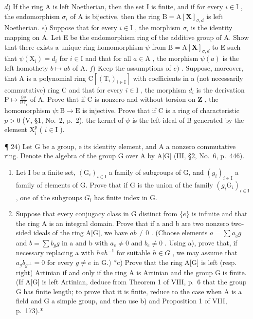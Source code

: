 \(d)\) If the ring A is left Noetherian, then the set I is finite, and if for every \(i \in \mathrm{I}\) , the endomorphism \(\sigma_i\) of A is bijective, then the ring \(\mathrm{B} = \mathrm{A}[\mathbf{X}]_{\sigma,d}\) is left Noetherian. \(e)\) Suppose that for every \(i \in \mathrm{I}\) , the morphism \(\sigma_i\) is the identity mapping on A. Let E be the endomorphism ring of the additive group of A. Show that there exists a unique ring homomorphism \(\psi\) from \(\mathrm{B} = \mathrm{A}[\mathbf{X}]_{\sigma,d}\) to E such that \(\psi(\mathrm{X}_i) = d_i\) for \(i \in \mathrm{I}\) and that for all \(a \in \mathrm{A}\) , the morphism \(\psi(a)\) is the left homothety \(b \mapsto ab\) of A. \(f)\) Keep the assumptions of \(e)\) . Suppose, moreover, that A is a polynomial ring \(\mathrm{C}[(\mathrm{T}_i)_{i \in \mathrm{I}}]\) with coefficients in a (not necessarily commutative) ring C and that for every \(i \in \mathrm{I}\) , the morphism \(d_i\) is the derivation \(\mathrm{P} \mapsto \frac{\partial\mathrm{P}}{\partial\mathrm{T}_i}\) of A. Prove that if C is nonzero and without torsion on \(\mathbf{Z}\) , the homomorphism \(\psi: \mathrm{B} \to \mathrm{E}\) is injective. Prove that if C is a ring of characteristic \(p > 0\) (V, §1, No.~2, p.~2), the kernel of \(\psi\) is the left ideal of B generated by the element \(\mathrm{X}_i^p\) ( \(i \in \mathrm{I}\) ).

¶ 24) Let G be a group, e its identity element, and A a nonzero commutative ring. Denote the algebra of the group G over A by A{[}G{]} (III, §2, No.~6, p.~446).

\begin{enumerate}
\def\labelenumi{\alph{enumi})}
\item
  Let I be a finite set, \((\mathrm{G}_{i})_{i\in\mathrm{I}}\) a family of subgroups of G, and \((g_{i})_{i\in\mathrm{I}}\) a family of elements of G. Prove that if G is the union of the family \((g_{i}\mathrm{G}_{i})_{i\in\mathrm{I}}\) , one of the subgroups \(G_{i}\) has finite index in G.
\item
  Suppose that every conjugacy class in G distinct from \(\{e\}\) is infinite and that the ring A is an integral domain. Prove that if a and b are two nonzero two-sided ideals of the ring A{[}G{]}, we have \(ab \neq 0\) . (Choose elements \(a = \sum a_g g\) and \(b = \sum b_g g\) in a and b with \(a_e \neq 0\) and \(b_e \neq 0\) . Using a), prove that, if necessary replacing a with \(hah^{-1}\) for suitable \(h \in G\) , we may assume that \(a_g b_{g^{-1}} = 0\) for every \(g \neq e\) in G.) *c) Prove that the ring A{[}G{]} is left (resp. right) Artinian if and only if the ring A is Artinian and the group G is finite. (If A{[}G{]} is left Artinian, deduce from Theorem 1 of VIII, p.~6 that the group G has finite length; to prove that it is finite, reduce to the case when A is a field and G a simple group, and then use b) and Proposition 1 of VIII, p.~173).*
\end{enumerate}

